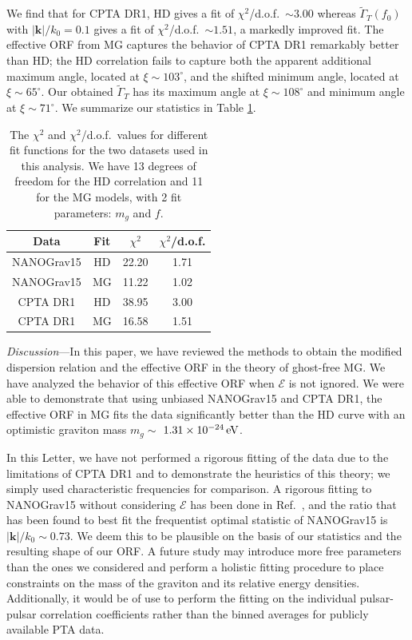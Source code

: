 \documentclass[prd,twocolumn,aps,psfig,nofootinbib,nobibnotes,superscriptaddress,preprintnumbers,times]{revtex4-2}
\newcommand{\eV}{\,{\rm eV}}
\begin{document}
We find that for CPTA DR1, HD gives a fit of $\chi^2$/d.o.f.\ $\sim 3.00$ whereas $\tilde{\Gamma}_T(f_0)$ with $|\boldsymbol{k}|/k_0 = 0.1$ gives a fit of $\chi^2$/d.o.f.\ $\sim 1.51$, a markedly improved fit. The effective ORF from MG captures the behavior of CPTA DR1 remarkably better than HD; the HD correlation fails to capture both the apparent additional maximum angle, located at $\xi \sim 103^\circ$, and the shifted minimum angle, located at $\xi \sim 65^\circ$. Our obtained $\tilde{\Gamma}_T$ has its maximum angle at $\xi \sim 108^\circ$ and minimum angle at $\xi \sim 71^\circ$.
We summarize our statistics in Table \ref{tbl:chi}.
\begin{table}[ht] 
\centering
\renewcommand{\arraystretch}{1.8}
\begin{tabular}{|c|c|c|c|}
\hline
\textbf{Data} & \textbf{Fit} & \textbf{$\chi^2$} & \textbf{$\chi^2$/d.o.f.} \\
\hline
NANOGrav15 & HD & 22.20 & 1.71 \\
\hline
NANOGrav15 & MG  & 11.22 & 1.02 \\
\hline
CPTA DR1 & HD & 38.95 & 3.00 \\
\hline
CPTA DR1 & MG  & 16.58 & 1.51 \\
\hline
\end{tabular}
\caption{The $\chi^2$ and $\chi^2$/d.o.f.\ values for different fit functions for the two datasets used in this analysis. We have 13 degrees of freedom for the HD correlation and 11 for the MG  models, with 2 fit parameters: $m_g$ and $f$. }
\label{tbl:chi}
\end{table}

\textit{Discussion}---In this paper, we have reviewed the methods to obtain the modified dispersion relation and the effective ORF in the theory of ghost-free MG. We have analyzed the behavior of this effective ORF when $\mathcal{E}$ is not ignored. We were able to demonstrate that using unbiased NANOGrav15 and CPTA DR1, the effective ORF in MG fits the data significantly better than the HD curve with an optimistic graviton mass $m_g \sim$ $1.31\times10^{-24} \eV$.
%

In this Letter, we have not performed a rigorous fitting of the data due to the limitations of CPTA DR1 and to demonstrate the heuristics of this theory; we simply used characteristic frequencies for comparison. A rigorous fitting to NANOGrav15 without considering $\mathcal{E}$ has been done in Ref.~\cite{Arjona:2024cex}, and the ratio that has been found to best fit the frequentist optimal statistic of NANOGrav15 is $|\boldsymbol{k}|/k_0 \sim 0.73$. We deem this to be plausible on the basis of our statistics and the resulting shape of our ORF. A future study may introduce more free parameters than the ones we considered and perform a holistic fitting procedure to place constraints on the mass of the graviton and its relative energy densities. Additionally, it would be of use to perform the fitting on the individual pulsar-pulsar correlation coefficients rather than the binned averages for publicly available PTA data.
\end{document}
